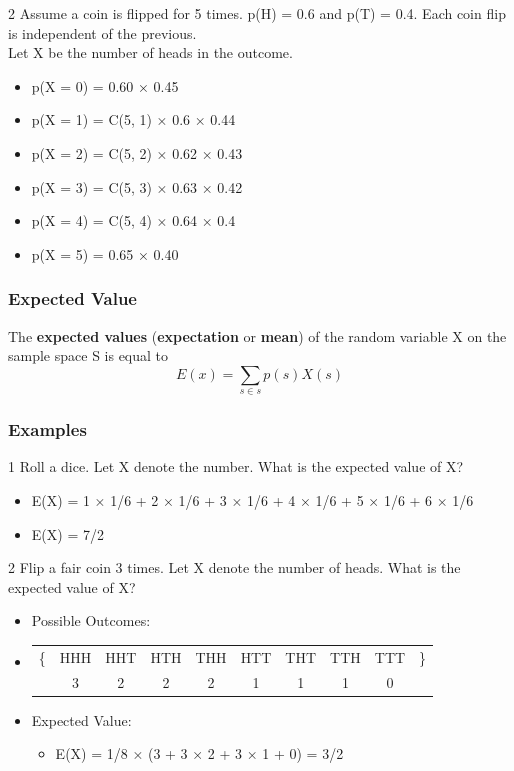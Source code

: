 \documentclass[12pt, letterpaper]{article}
\newcommand{\exheader}[1][ex]{{\tiny{#1}\normalsize}}
\begin{document}
\bigbreak
\bigbreak

\exheader[2] Assume a coin is flipped for 5 times. p(H) = 0.6 and p(T) = 0.4. Each coin flip is independent of the previous. \\ Let X be the number of heads in the outcome. 
\begin{itemize}[label={}]
	\item p(X = 0) = 0.60 × 0.45
	\item p(X = 1) = C(5, 1) × 0.6 × 0.44
	\item p(X = 2) = C(5, 2) × 0.62 × 0.43
	\item p(X = 3) = C(5, 3) × 0.63 × 0.42
	\item p(X = 4) = C(5, 4) × 0.64 × 0.4
	\item p(X = 5) = 0.65 × 0.40
\end{itemize}

\pagebreak

\subsubsection*{Expected Value}
The \textbf{expected values} (\textbf{expectation} or \textbf{mean}) of the random variable X on the sample space S is equal to \[E(x) = \sum_{s \in s} p(s)X(s)\]

\bigbreak

\subsubsection*{Examples}

\exheader[1] Roll a dice. Let X denote the number. What is the expected value of X?
\begin{itemize}[leftmargin=*,  label={}]
	\item E(X) = 1 × 1/6 + 2 × 1/6 + 3 × 1/6 + 4 × 1/6 + 5 × 1/6 + 6 × 1/6
	\item E(X) = 7/2
\end{itemize}

\bigbreak
\bigbreak

\exheader[2] Flip a fair coin 3 times. Let X denote the number of heads. What is the expected value of X?
\begin{itemize}[leftmargin=*,  label={}]
	\item Possible Outcomes:
	\item 
	\begin{tabular}{r c c c c c c c c l}
		\{ & HHH & HHT & HTH & THH & HTT & THT & TTH & TTT & \} \\
		& 3 & 2 & 2 & 2 & 1 & 1 & 1 & 0 & \\
	\end{tabular}
	\item Expected Value:
	\begin{itemize}
		\item E(X) = 1/8 × (3 + 3 × 2 + 3 × 1 + 0) = 3/2
	\end{itemize}
\end{itemize}
\end{document}
